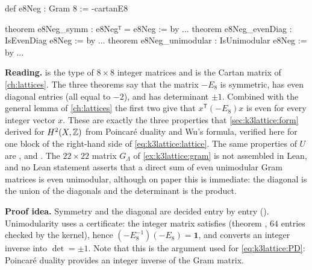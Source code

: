 \begin{leanbox}
\begin{leancode}
def e8Neg : Gram 8 := -cartanE8

theorem e8Neg_symm : e8Negᵀ = e8Neg := by ...
theorem e8Neg_evenDiag : IsEvenDiag e8Neg := by ...
theorem e8Neg_unimodular : IsUnimodular e8Neg := by ...
\end{leancode}
\textbf{Reading.}  is the type of $8\times8$ integer matrices and
 is the Cartan matrix of \cref{ch:lattices}. The three theorems say that the
matrix $-E_8$ is symmetric, has even diagonal entries (all equal to $-2$), and has
determinant $\pm1$. Combined with the general lemma
 of \cref{ch:lattices} the first two give that
$x^{\mathsf T}(-E_8)x$ is even for every integer vector $x$. These are exactly the three
properties that \cref{sec:k3lattice:form} derived for $H^2(X,\mathbb{Z})$ from Poincaré duality and
Wu's formula, verified here for one block of the right-hand side of
\eqref{eq:k3lattice:lattice}. The same properties of $U$ are ,
 and . The $22\times22$ matrix
$G_\Lambda$ of \cref{ex:k3lattice:gram} is not assembled in Lean, and no Lean statement
asserts that a direct sum of even unimodular Gram matrices is even unimodular, although on
paper this is immediate: the diagonal is the union of the diagonals and the determinant is
the product.

\textbf{Proof idea.} Symmetry and the diagonal are decided entry by entry ().
Unimodularity uses a certificate: the integer matrix  satisfies
 (theorem , $64$ entries checked by
the kernel), hence $(-E_8^{-1})(-E_8)=\mathbf1$, and 
converts an integer inverse into $\det=\pm1$. Note that this is the argument used for
\eqref{eq:k3lattice:PD}: Poincaré duality provides an integer inverse of the Gram matrix.
\end{leanbox}

